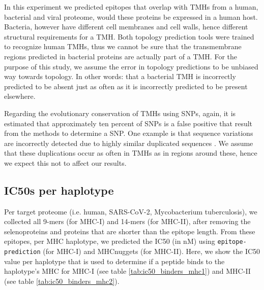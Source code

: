 
In this experiment we predicted epitopes that overlap with 
TMHs from a human, bacterial and viral proteome,
would these proteins be expressed in a human host.
Bacteria, however have different cell membranes and cell walls, 
hence different structural requirements for a TMH.
Both topology prediction tools were trained to recognize
human TMHs, thus we cannot be sure that
the transmembrane regions predicted in bacterial proteins
are actually part of a TMH.
For the purpose of this study, we assume the 
error in topology predictions to be unbiased way towards topology.
In other words: that a bacterial TMH is incorrectly
predicted to be absent just as often as it is incorrectly
predicted to be present elsewhere.


Regarding the evolutionary conservation of TMHs using SNPs,
again, it is estimated that approximately ten percent
of SNPs is a false positive that result from the methods to determine
a SNP. One example is that sequence variations are incorrectly
detected due to highly similar duplicated sequences \cite{musumeci2010single}.
We assume that these duplications occur as often in TMHs as in
regions around these, hence we expect this not to affect our results.

\subsection{IC50s per haplotype}
\label{subsec:ic50s_per_haplotype}

Per target proteome (i.e. human, SARS-CoV-2, Mycobacterium tuberculosis),
we collected all 9-mers (for MHC-I) and 14-mers (for MHC-II),
after removing the selenoproteins and proteins that are shorter
than the epitope length.
From these epitopes, per MHC haplotype,
we predicted the IC50 (in nM) using \verb;epitope-prediction; (for MHC-I)
and MHCnuggets (for MHC-II). 
Here, we show the IC50 value per haplotype that
is used to determine if a peptide binds to the haplotype's MHC
for MHC-I (see table \ref{tab:ic50_binders_mhc1}) and 
MHC-II (see table \ref{tab:ic50_binders_mhc2}).

